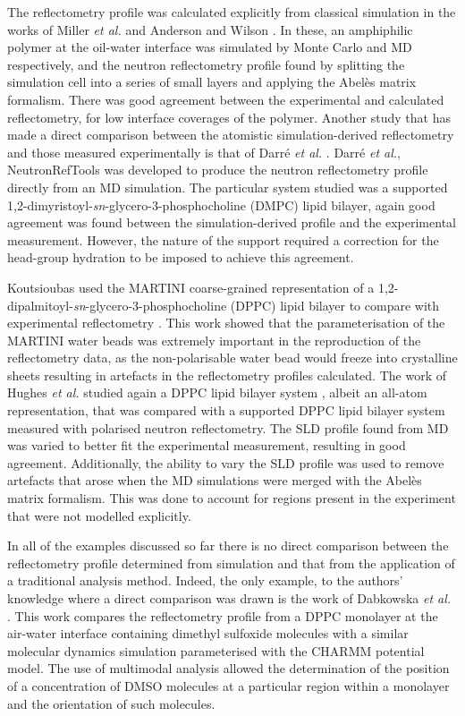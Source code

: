 \documentclass[amsmath,amssymb,twocolumn,superscriptaddress]{revtex4-1}
\begin{document}
The reflectometry profile was calculated explicitly from classical simulation in the works of Miller \emph{et al.} and Anderson and Wilson \cite{miller_monte_2003,anderson_molecular_2004}.
In these, an amphiphilic polymer at the oil-water interface was simulated by Monte Carlo and MD respectively, and the neutron reflectometry profile found by splitting the simulation cell into a series of small layers and applying the Abel\`{e}s matrix formalism.
There was good agreement between the experimental and calculated reflectometry, for low interface coverages of the polymer.
Another study that has made a direct comparison between the atomistic simulation-derived reflectometry and those measured experimentally is that of Darr\'{e} \emph{et al.} \cite{darre_molecular_2015}.
Darr\'{e} \emph{et al.}, NeutronRefTools was developed to produce the neutron reflectometry profile directly from an MD simulation.
The particular system studied was a supported 1,2-dimyristoyl-\emph{sn}-glycero-3-phosphocholine (DMPC) lipid bilayer, again good agreement was found between the simulation-derived profile and the experimental measurement.
However, the nature of the support required a correction for the head-group hydration to be imposed to achieve this agreement.

Koutsioubas used the MARTINI coarse-grained representation of a 1,2-dipalmitoyl-\emph{sn}-glycero-3-phosphocholine (DPPC) lipid bilayer to compare with experimental reflectometry \cite{koutsioubas_combined_2016}.
This work showed that the parameterisation of the MARTINI water beads was extremely important in the reproduction of the reflectometry data, as the non-polarisable water bead would freeze into crystalline sheets resulting in artefacts in the reflectometry profiles calculated.
The work of Hughes \emph{et al.} studied again a DPPC lipid bilayer system \cite{hughes_interpretation_2016}, albeit an all-atom representation, that was compared with a supported DPPC lipid bilayer system measured with polarised neutron reflectometry.
The SLD profile found from MD was varied to better fit the experimental measurement, resulting in good agreement.
Additionally, the ability to vary the SLD profile was used to remove artefacts that arose when the MD simulations were merged with the Abel\`{e}s matrix formalism.
This was done to account for regions present in the experiment that were not modelled explicitly.

In all of the examples discussed so far there is no direct comparison between the reflectometry profile determined from simulation and that from the application of a traditional analysis method.
Indeed, the only example, to the authors' knowledge where a direct comparison was drawn is the work of Dabkowska \emph{et al.} \cite{dabkowska_modulation_2014}.
This work compares the reflectometry profile from a DPPC monolayer at the air-water interface containing dimethyl sulfoxide molecules with a similar molecular dynamics simulation parameterised with the CHARMM potential model.
The use of multimodal analysis allowed the determination of the position of a concentration of DMSO molecules at a particular region within a monolayer and the orientation of such molecules.
\end{document}
